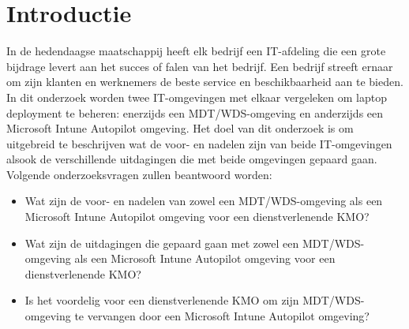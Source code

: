
\section{Introductie} %
\label{sec:introductie}

In de hedendaagse maatschappij heeft elk bedrijf een IT-afdeling die een grote bijdrage levert aan het succes of falen van het bedrijf. Een bedrijf streeft ernaar om zijn klanten en werknemers de beste service en beschikbaarheid aan te bieden. In dit onderzoek worden twee IT-omgevingen met elkaar vergeleken om laptop deployment te beheren: enerzijds een MDT/WDS-omgeving en anderzijds een Microsoft Intune Autopilot omgeving. 
\newline
Het doel van dit onderzoek is om uitgebreid te beschrijven wat de voor- en nadelen zijn van beide IT-omgevingen alsook de verschillende uitdagingen die met beide omgevingen gepaard gaan. Volgende onderzoeksvragen zullen beantwoord worden:

\begin{itemize}
    \item Wat zijn de voor- en nadelen van zowel een MDT/WDS-omgeving als een Microsoft Intune Autopilot omgeving voor een dienstverlenende KMO?
    \item Wat zijn de uitdagingen die gepaard gaan met zowel een MDT/WDS-omgeving als een Microsoft Intune Autopilot omgeving voor een dienstverlenende KMO?
    \item Is het voordelig voor een dienstverlenende KMO om zijn MDT/WDS-omgeving te vervangen door een Microsoft Intune Autopilot omgeving?
\end{itemize}






